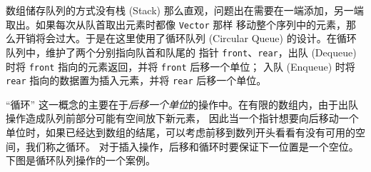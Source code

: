 数组储存队列的方式没有{\kaishu 栈 (Stack)} 那么直观，问题出在需要在一端添加，另一端取出。如果每次从队首取出元素时都像 \lstinline{Vector} 那样%
移动整个序列中的元素，那么开销将会过大。于是在这里使用了{\kaishu 循环队列 (Circular Queue)} 的设计。在循环队列中，维护了两个分别指向队首和队尾的%
指针 \lstinline{front}、\lstinline{rear}，{\kaishu 出队 (Dequeue)} 时将 \lstinline{front} 指向的元素返回，并将 \lstinline{front} 后移一个单位；%
{\kaishu 入队 (Enqueue)} 时将 \lstinline{rear} 指向的数据置为插入元素，并将 \lstinline{rear} 后移一个单位。%

{\kaishu “循环”} 这一概念的主要在于\emph{后移一个单位}的操作中。在有限的数组内，由于出队操作造成队列前部分可能有空间放下新元素，%
因此当一个指针想要向后移动一个单位时，如果已经达到数组的结尾，可以考虑前移到数列开头看看有没有可用的空间，我们称之{\kaishu 循环}。%
对于插入操作，后移和循环时要保证下一位置是一个空位。下图是循环队列操作的一个案例。


